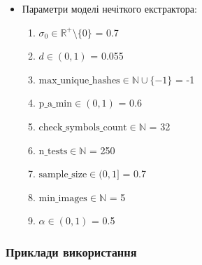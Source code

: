 \documentclass[11pt]{article}
\providecommand{\tightlist}{%
      \setlength{\itemsep}{0pt}\setlength{\parskip}{0pt}}
\begin{document}
    \begin{itemize}
\item
  Параметри моделі нечіткого екстрактора:

  \begin{enumerate}
  \def\labelenumi{\arabic{enumi}.}
  \tightlist
  \item
    \(\sigma_0 \in \mathbb{R}^+\setminus \{0\}\) = 0.7
  \item
    \(d \in (0,1)\) = 0.055
  \item
    \(\text{max_unique_hashes} \in \mathbb{N}\cup \{-1\}\) = -1
  \item
    \(\text{p_a_min} \in (0,1)\) = 0.6
  \item
    \(\text{check_symbols_count} \in \mathbb{N}\) = 32
  \item
    \(\text{n_tests} \in \mathbb{N}\) = 250
  \item
    \(\text{sample_size} \in (0,1]\) = 0.7
  \item
    \(\text{min_images} \in \mathbb{N}\) = 5
  \item
    \(\alpha \in (0,1)\) = 0.5
  \end{enumerate}
\end{itemize}

    \hypertarget{ux43fux440ux438ux43aux43bux430ux434ux438-ux432ux438ux43aux43eux440ux438ux441ux442ux430ux43dux43dux44f}{%
\subsubsection{Приклади
використання}\label{ux43fux440ux438ux43aux43bux430ux434ux438-ux432ux438ux43aux43eux440ux438ux441ux442ux430ux43dux43dux44f}}
\end{document}
